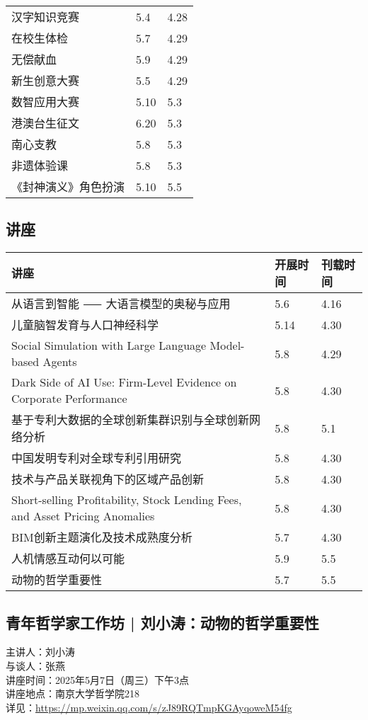 \documentclass[letterpaper, 12pt]{article}
\begin{document}
\begin{multicols}{2}
{\begin{longtable}{|>{\centering\arraybackslash}m{}|m{}|m{}|}
    汉字知识竞赛 & 5.4 & 4.28\\
    在校生体检 & 5.7 & 4.29\\
    无偿献血 & 5.9 & 4.29\\
    新生创意大赛 & 5.5 & 4.29\\
    数智应用大赛 & 5.10 & 5.3\\
    港澳台生征文 & 6.20 & 5.3\\
    南心支教 & 5.8 & 5.3\\
    非遗体验课 & 5.8 & 5.3\\
    《封神演义》角色扮演 & 5.10 & 5.5\\
    \hline
\end{longtable}
\unskip
\unpenalty
\unpenalty}\unvbox\colbbox
\end{multicols}
\begin{multicols}{2}
\pagebreak

\section{讲座}
\begin{tabular}{|>{\centering\arraybackslash}m{}|m{}|m{}|}
    \hline
    讲座 & 开展时间 & 刊载时间\\
    \hline\hline
    从语言到智能 ⸺ 大语言模型的奥秘与应用 & 5.6 & 4.16\\\hline
    儿童脑智发育与人口神经科学 & 5.14 & 4.30\\\hline
    Social Simulation with Large Language Model-based Agents & 5.8 & 4.29\\\hline
    Dark Side of AI Use: Firm-Level Evidence on Corporate Performance & 5.8 & 4.30\\\hline
    基于专利大数据的全球创新集群识别与全球创新网络分析 & 5.8 & 5.1\\\hline
    中国发明专利对全球专利引用研究 & 5.8 & 4.30\\\hline
    技术与产品关联视角下的区域产品创新 & 5.8 & 4.30\\\hline
    Short-selling Profitability, Stock Lending Fees, and Asset Pricing Anomalies & 5.8 & 4.30\\\hline
    BIM创新主题演化及技术成熟度分析 & 5.7 & 4.30\\\hline
    人机情感互动何以可能 & 5.9 & 5.5\\\hline
    动物的哲学重要性 & 5.7 & 5.5\\\hline
\end{tabular}
\subsection{青年哲学家工作坊 | 刘小涛：动物的哲学重要性} %
主讲人：刘小涛
\\与谈人：张燕
\\讲座时间：2025年5月7日（周三）下午3点
\\讲座地点：南京大学哲学院218
\\详见：\url{https://mp.weixin.qq.com/s/zJ89RQTmpKGAyqoweM54fg}

\end{multicols}
\end{document}
